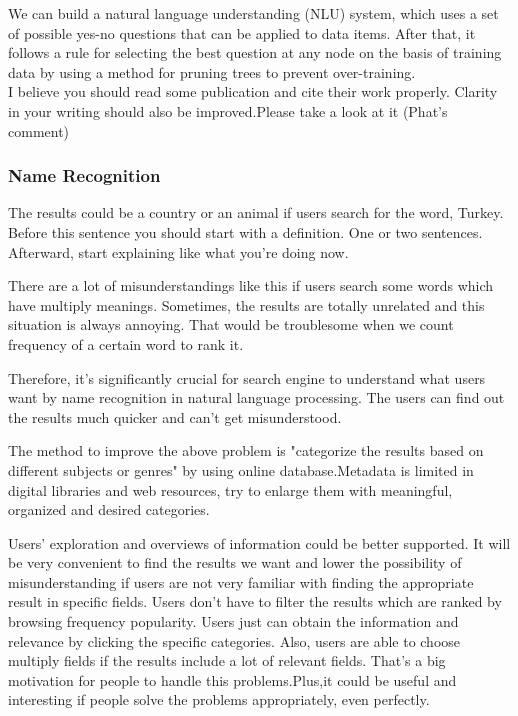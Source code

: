 We can build a natural language understanding (NLU) system, which uses a set of possible yes-no questions that can be applied to data items. After that, it follows a rule for selecting the best question at any node on the basis of training data by using a method for pruning trees to prevent over-training.\\ 

I believe you should read some publication and cite their work properly. Clarity in your writing should also be improved.Please take a look at it (Phat's comment)

\subsubsection*{Name Recognition}
The results could be a country or an animal if users search for the word, Turkey.\\Before this sentence you should start with a definition. One or two sentences. Afterward, start explaining like what you're doing now.

There are a lot of misunderstandings like this if users search some words which have multiply meanings. Sometimes, the results are totally unrelated and this situation is always annoying. That would be troublesome when we count frequency of a certain word to rank it.
 
Therefore, it's significantly crucial for search engine to understand what users want by name recognition in natural language processing. The users can find out the results much quicker and can't get misunderstood.

The method to improve the above problem is "categorize the results based on different subjects or genres" by using online database.Metadata is limited in digital libraries and web resources, try to enlarge them with meaningful, organized and desired categories.\cite{10.1145/1141753.1141801}

Users' exploration and overviews of information could be better supported. It will be very convenient to find the results we want and lower the possibility of misunderstanding if users are not very familiar with finding the appropriate result in specific fields.\cite{DBLP:journals/jis/NaT09} Users don't have to filter the results which are ranked by browsing frequency  popularity. Users just can obtain the information and relevance by clicking the specific categories. Also, users are able to choose multiply fields if the results include a lot of relevant fields. That's a big motivation for people to handle this problems.Plus,it could be useful and interesting if people solve the problems appropriately, even perfectly.  

